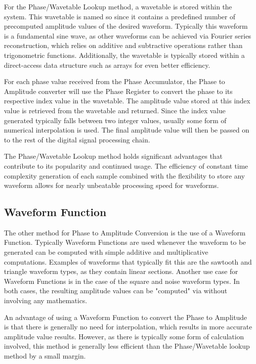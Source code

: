 \documentclass[a4paper,12pt]{report}
\begin{document}
For the Phase/Wavetable Lookup method, a wavetable is stored within the system. This wavetable is named so since it contains a predefined number of precomputed amplitude values of the desired waveform. Typically this waveform is a fundamental sine wave, as other waveforms can be achieved via Fourier series reconstruction, which relies on additive and subtractive operations rather than trigonometric functions. Additionally, the wavetable is typically stored within a direct-access data structure such as arrays for even better efficiency.


For each phase value received from the Phase Accumulator, the Phase to Amplitude converter will use the Phase Register to convert the phase to its respective index value in the wavetable. The amplitude value stored at this index value is retrieved from the wavetable and returned. Since the index value generated typically falls between two integer values, usually some form of numerical interpolation is used. The final amplitude value will then be passed on to the rest of the digital signal processing chain.

The Phase/Wavetable Lookup method holds significant advantages that contribute to its popularity and continued usage. The efficiency of constant time complexity generation of each sample combined with the flexibility to store any waveform allows for nearly unbeatable processing speed for waveforms.

\subsection{Waveform Function}
\label{subsec:waveformfunction}
The other method for Phase to Amplitude Conversion is the use of a Waveform Function. Typically Waveform Functions are used whenever the waveform to be generated can be computed with simple additive and multiplicative computations. Examples of waveforms that typically fit this are the sawtooth and triangle waveform types, as they contain linear sections. Another use case for Waveform Functions is in the case of the square and noise waveform types. In both cases, the resulting amplitude values can be "computed" via without involving any mathematics.

An advantage of using a Waveform Function to convert the Phase to Amplitude is that there is generally no need for interpolation, which results in more accurate amplitude value results. However, as there is typically some form of calculation involved, this method is generally less efficient than the Phase/Wavetable lookup method by a small margin.
\end{document}
